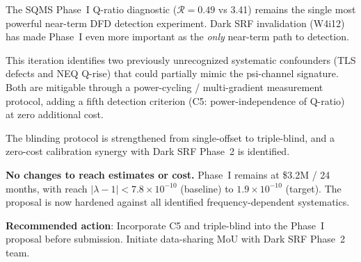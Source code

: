 \documentclass[11pt]{article}
\newcommand{\lbone}{|\lambda - 1|}
\newcommand{\ee}[1]{\times 10^{#1}}
\theoremstyle{definition}
\theoremstyle{remark}
\begin{document}
\begin{tcolorbox}[colback=green!5!white, colframe=green!50!black,
  title=\textbf{W4i13 P11 BOTTOM LINE}]

The SQMS Phase~I Q-ratio diagnostic ($\mathcal{R} = 0.49$ vs 3.41)
remains the single most powerful near-term DFD detection experiment.
Dark SRF invalidation (W4i12) has made Phase~I even more important
as the \emph{only} near-term path to detection.

This iteration identifies two previously unrecognized systematic
confounders (TLS defects and NEQ Q-rise) that could partially mimic
the psi-channel signature. Both are mitigable through a power-cycling
/ multi-gradient measurement protocol, adding a fifth detection
criterion (C5: power-independence of Q-ratio) at zero additional cost.

The blinding protocol is strengthened from single-offset to triple-blind,
and a zero-cost calibration synergy with Dark SRF Phase~2 is identified.

\textbf{No changes to reach estimates or cost.} Phase~I remains at
\$3.2M / 24 months, with reach $\lbone < 7.8\ee{-10}$ (baseline)
to $1.9\ee{-10}$ (target). The proposal is now hardened against
all identified frequency-dependent systematics.

\textbf{Recommended action}: Incorporate C5 and triple-blind into
the Phase~I proposal before submission. Initiate data-sharing MoU
with Dark SRF Phase~2 team.
\end{tcolorbox}
\end{document}
